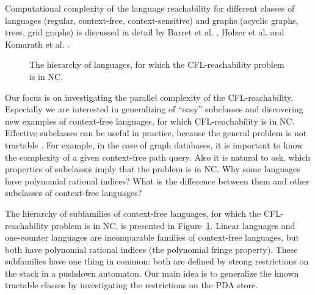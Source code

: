 \documentclass{ws-ijfcs}
\begin{document}
Computational complexity of the language reachability for different classes of languages (regular, context-free, context-sensitive) and graphs (acyclic graphs, trees, grid graphs) is discussed in detail by Barret et al. \cite{Barrett}, Holzer et al.\cite{labelledGraphs} and Komarath et al. \cite{LReach}. 


\begin{figure}
\centering
{}
\caption{The hierarchy of languages, for which the CFL-reachability problem is in NC.}
\label{hierarchy}      
\end{figure}
Our focus is on investigating the parallel complexity of the CFL-reachability. Especially we are interested in generalizing of ``easy'' subclasses and discovering new examples of context-free languages, for which CFL-reachability is in NC. Effective subclasses can be useful in practice, because the general problem is not tractable \cite{ExperimentalCFPQ}. For example, in the case of graph databases, it is important to know the complexity of a given context-free path query. Also it is natural to ask, which properties of subclasses imply that the problem is in NC. Why some languages have polynomial rational indices? What is the difference between them and other subclasses of context-free languages?


The hierarchy of subfamilies of context-free languages, for which the CFL-reachability problem is in NC, is presented in Figure~\ref{hierarchy}. Linear languages and one-counter languages are incomparable families of context-free languages, but both have polynomial rational indices (the polynomial fringe property). These subfamilies have one thing in common: both are defined by strong restrictions on the stack in a pushdown automaton. Our main idea is to generalize the known tractable classes by investigating the restrictions on the PDA store.
\end{document}

